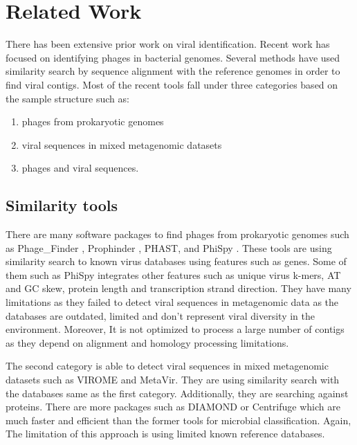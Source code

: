 
\chapter{Related Work} %

\label{Chapter2} %



There has been extensive prior work on viral identification. Recent work has focused on identifying phages in bacterial genomes. Several methods have used similarity search by sequence alignment with the reference genomes in order to find viral contigs. Most of the recent tools fall under three categories based on the sample structure such as:
\begin{enumerate}
	\item phages from prokaryotic genomes
	\item viral sequences in mixed metagenomic datasets
	\item phages and viral sequences. 
\end{enumerate} 

\section{Similarity tools}

There are many software packages to find phages from prokaryotic genomes such as Phage\_Finder \cite{fouts2006phage_finder}, Prophinder \cite{lima2008prophinder}, PHAST\cite{zhou2011phast}, and PhiSpy \cite{akhter2012phispy}. These tools are using similarity search to known virus databases using features such as genes. Some of them such as PhiSpy integrates other features such as  unique virus k-mers, AT and GC skew, protein length and transcription strand direction. They have many limitations as they failed to detect viral sequences in metagenomic data as the databases are outdated, limited and don't represent viral diversity in the environment. Moreover, It is not optimized to process a large number of contigs \cite{roux2015virsorter} as they depend on alignment and homology processing limitations. 

The second category is able to detect viral sequences in mixed metagenomic datasets such as VIROME \cite{wommack2012virome} and MetaVir\cite{roux2011metavir}. They are using similarity search with the databases same as the first category. Additionally, they are searching against proteins. There are more packages such as DIAMOND \cite{buchfink2014Diamond} or Centrifuge \cite{kim2016centrifuge} which are much faster and efficient than the former tools for microbial classification. Again, The limitation of this approach is using limited known reference databases. 


